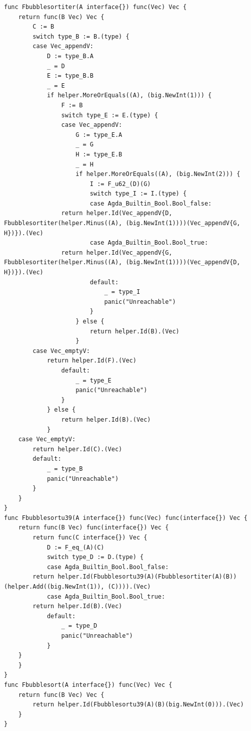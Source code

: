 \documentclass{VUMIFPSbakalaurinis}
\begin{document}
\begin{lstlisting}[language=GoCust]
func Fbubblesortiter(A interface{}) func(Vec) Vec {
	return func(B Vec) Vec {
		C := B
		switch type_B := B.(type) {
		case Vec_appendV:
			D := type_B.A
			_ = D
			E := type_B.B
			_ = E
			if helper.MoreOrEquals((A), (big.NewInt(1))) {
				F := B
				switch type_E := E.(type) {
				case Vec_appendV:
					G := type_E.A
					_ = G
					H := type_E.B
					_ = H
					if helper.MoreOrEquals((A), (big.NewInt(2))) {
						I := F_u62_(D)(G)
						switch type_I := I.(type) {
						case Agda_Builtin_Bool.Bool_false:
				return helper.Id(Vec_appendV{D, Fbubblesortiter(helper.Minus((A), (big.NewInt(1))))(Vec_appendV{G, H})}).(Vec)
						case Agda_Builtin_Bool.Bool_true:
				return helper.Id(Vec_appendV{G, Fbubblesortiter(helper.Minus((A), (big.NewInt(1))))(Vec_appendV{D, H})}).(Vec)
						default:
							_ = type_I
							panic("Unreachable")
						}
					} else {
						return helper.Id(B).(Vec)
					}
		case Vec_emptyV:
			return helper.Id(F).(Vec)
				default:
					_ = type_E
					panic("Unreachable")
				}
			} else {
				return helper.Id(B).(Vec)
			}
	case Vec_emptyV:
		return helper.Id(C).(Vec)
		default:
			_ = type_B
			panic("Unreachable")
		}
	}
}
func Fbubblesortu39(A interface{}) func(Vec) func(interface{}) Vec {
	return func(B Vec) func(interface{}) Vec {
		return func(C interface{}) Vec {
			D := F_eq_(A)(C)
			switch type_D := D.(type) {
			case Agda_Builtin_Bool.Bool_false:
		return helper.Id(Fbubblesortu39(A)(Fbubblesortiter(A)(B))(helper.Add((big.NewInt(1)), (C)))).(Vec)
			case Agda_Builtin_Bool.Bool_true:
		return helper.Id(B).(Vec)
			default:
				_ = type_D
				panic("Unreachable")
			}
	}
	}
}
func Fbubblesort(A interface{}) func(Vec) Vec {
	return func(B Vec) Vec {
		return helper.Id(Fbubblesortu39(A)(B)(big.NewInt(0))).(Vec)
	}
}
\end{lstlisting}
\end{document}
